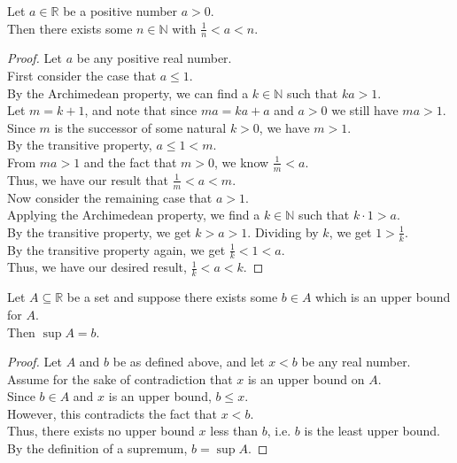 \documentclass{article}
\newenvironment{theorem}[1]{\renewcommand\theinnercustomthm{#1}\innercustomthm}
  {\endinnercustomthm}
\begin{document}
\begin{theorem}{2}
    Let $a \in \mathbb R$ be a positive number $a > 0$. \\
    Then there exists some $n \in \mathbb N$ with $\frac{1}{n} < a < n$.
\end{theorem}
\begin{proof}
    Let $a$ be any positive real number. \\
    First consider the case that $a \le 1$. \\
    By the Archimedean property, we can find a $k \in \mathbb N$ such that $k a > 1$. \\
    Let $m = k+1$, and note that since $ma=ka+a$ and $a > 0$ we still have $ma >1$. \\
    Since $m$ is the successor of some natural $k > 0$, we have $m > 1$. \\
    By the transitive property, $a \le 1 < m$. \\
    From $m a > 1$ and the fact that $m > 0$, we know $\frac{1}{m} < a$. \\
    Thus, we have our result that $\frac{1}{m}<a<m$. \\
    Now consider the remaining case that $a > 1$. \\
    Applying the Archimedean property, we find a $k \in \mathbb N$ such that $k \cdot 1 > a$. \\
    By the transitive property, we get $k >a > 1$. Dividing by $k$, we get $1 > \frac{1}{k}$. \\
    By the transitive property again, we get $\frac{1}{k} < 1 < a$. \\
    Thus, we have our desired result, $\frac{1}{k} < a < k$.
\end{proof}

\newpage{}
\begin{theorem}{3}
    Let $A \subseteq \mathbb R$ be a set and suppose there exists some $b \in A$ which is an upper bound for $A$.\\  Then $\sup A = b$.
\end{theorem}
\begin{proof}
    Let $A$ and $b$ be as defined above, and let $x < b$ be any real number. \\
    Assume for the sake of contradiction that $x$ is an upper bound on $A$. \\
    Since $b \in A$ and $x$ is an upper bound, $b \le x$. \\
    However, this contradicts the fact that $x < b$. \\
    Thus, there exists no upper bound $x$ less than $b$, i.e. $b$ is the least upper bound. \\
    By the definition of a supremum, $b = \sup A$.
\end{proof}
\end{document}
